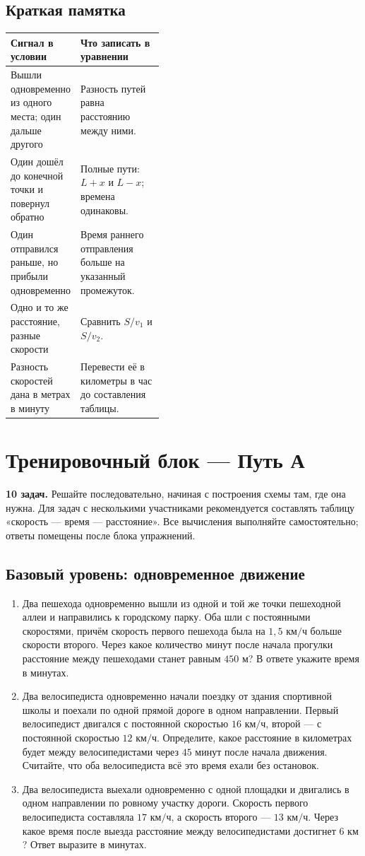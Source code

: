 \documentclass[a4paper,12pt]{article}
\newcommand{\topic}[1]{\section*{\color{darkaccent}#1}}
\newcommand{\subtopic}[1]{\subsection*{\color{accent}#1}}
\newcommand{\kmh}{\text{ км/ч}}
\newcommand{\kms}{\text{ км}}
\newcommand{\met}{\text{ м}}
\begin{document}
\subtopic{Краткая памятка}
\begin{center}
\renewcommand{\arraystretch}{1.35}
\begin{tabularx}{\linewidth}{@{}p{0.43\linewidth}X@{}}
\toprule
Сигнал в условии & Что записать в уравнении \\
\midrule
Вышли одновременно из одного места; один дальше другого & Разность путей равна расстоянию между ними. \\
Один дошёл до конечной точки и повернул обратно & Полные пути: $L+x$ и $L-x$; времена одинаковы. \\
Один отправился раньше, но прибыли одновременно & Время раннего отправления больше на указанный промежуток. \\
Одно и то же расстояние, разные скорости & Сравнить $S/v_1$ и $S/v_2$. \\
Разность скоростей дана в метрах в минуту & Перевести её в километры в час до составления таблицы. \\
\bottomrule
\end{tabularx}
\end{center}

\clearpage
\topic{Тренировочный блок --- Путь А}
\textbf{10 задач.} Решайте последовательно, начиная с построения схемы там, где она нужна. Для задач с несколькими участниками рекомендуется составлять таблицу «скорость --- время --- расстояние». Все вычисления выполняйте самостоятельно; ответы помещены после блока упражнений.

\subtopic{Базовый уровень: одновременное движение}
\begin{enumerate}[label=\textbf{\arabic*.},wide=0pt]
\item Два пешехода одновременно вышли из одной и той же точки пешеходной аллеи и направились к городскому парку. Оба шли с постоянными скоростями, причём скорость первого пешехода была на $1{,}5\kmh$ больше скорости второго. Через какое количество минут после начала прогулки расстояние между пешеходами станет равным $450\met$? В ответе укажите время в минутах.

\item Два велосипедиста одновременно начали поездку от здания спортивной школы и поехали по одной прямой дороге в одном направлении. Первый велосипедист двигался с постоянной скоростью $16\kmh$, второй --- с постоянной скоростью $12\kmh$. Определите, какое расстояние в километрах будет между велосипедистами через $45$ минут после начала движения. Считайте, что оба велосипедиста всё это время ехали без остановок.

\item Два велосипедиста выехали одновременно с одной площадки и двигались в одном направлении по ровному участку дороги. Скорость первого велосипедиста составляла $17\kmh$, а скорость второго --- $13\kmh$. Через какое время после выезда расстояние между велосипедистами достигнет $6\kms$? Ответ выразите в минутах.
\end{enumerate}
\end{document}
